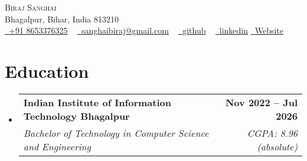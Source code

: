 \documentclass[letterpaper,11pt]{article}
\makeatletter
\newcommand{\resumeItem}[1]{
  \item\small{
    {#1 \vspace{-2pt}}
  }
}
\newcommand{\resumeSubheading}[4]{
  \vspace{-5pt}\item
    \begin{tabular*}{1.0\textwidth}[t]{l@{\extracolsep{\fill}}r}
      \textbf{#1} & \textbf{\small #2} \\
      \textit{\small#3} & \textit{\small #4} \\
    \end{tabular*}\vspace{-5pt}
}
\newcommand{\collegeItem}[1]{
    \item
    \begin{tabular*}{0.97\textwidth}{l@{\extracolsep{\fill}}r}
      \textit{\small#1} & \textit{\small } \\
    \end{tabular*}\vspace{-4pt}
}
\newcommand{\resumeSubHeadingListStart}{\begin{itemize}[leftmargin=0.0in, label={}]}
\newcommand{\resumeSubHeadingListEnd}{\end{itemize}}
\makeatother
\begin{document}

\begin{center}
    {\Huge \scshape Biraj Sanghai} \\ \vspace{1pt}
    Bhagalpur, Bihar, India 813210 \\ \vspace{1pt}
    \href{tel:918653376325}{\color{Blue} \raisebox{-0.2\height}\faPhone\
    \underline {+91 8653376325}} ~ \href{mailto:sanghaibiraj@gmail.com}{\color{Blue} \raisebox{-0.2\height}\faEnvelope\  \underline{sanghaibiraj@gmail.com}} ~ 
    \href{https://github.com/sanghaibiraj}{\color{Blue} \raisebox{-0.2\height}\faGithub\ \underline{github}} ~ 
    \href{https://www.linkedin.com/in/biraj-sanghai-iiitbh}{\color{Blue} \raisebox{-0.2\height}\faLinkedin\ \underline{linkedin}}
    \hspace{2pt}
    \href{https://biraj-sanghai.vercel.app/}{\color{Blue} 
    \raisebox{-0.2\height}\faGlobe\ \underline{Website}}
    \vspace{-8pt}
\end{center}


\section{Education}
  \resumeSubHeadingListStart
    \resumeSubheading
      {Indian Institute of Information Technology Bhagalpur}{Nov 2022 -- Jul 2026}
      {Bachelor of Technology in Computer Science and Engineering}{CGPA: 8.96 (absolute)}
  \resumeSubHeadingListEnd
  \vspace{-16pt}
  
\end{document}
